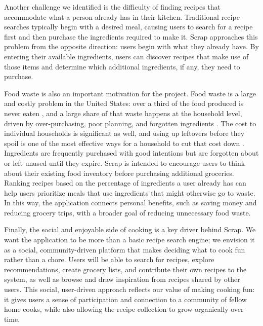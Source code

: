 Another challenge we identified is the difficulty of finding recipes that accommodate what a person already has in their kitchen. Traditional recipe searches typically begin with a desired meal, causing users to search for a recipe first and then purchase the ingredients required to make it. Scrap approaches this problem from the opposite direction: users begin with what they already have. By entering their available ingredients, users can discover recipes that make use of those items and determine which additional ingredients, if any, they need to purchase.

Food waste is also an important motivation for the project. Food waste is a large and costly problem in the United States: over a third of the food produced is never eaten \cite{EPAFoodWasteCost}, and a large share of that waste happens at the household level, driven by over-purchasing, poor planning, and forgotten ingredients \cite{ReFEDProblem}. The cost to individual households is significant as well, and using up leftovers before they spoil is one of the most effective ways for a household to cut that cost down \cite{USDATellusLeftovers}. Ingredients are frequently purchased with good intentions but are forgotten about or left unused until they expire. Scrap is intended to encourage users to think about their existing food inventory before purchasing additional groceries. Ranking recipes based on the percentage of ingredients a user already has can help users prioritize meals that use ingredients that might otherwise go to waste. In this way, the application connects personal benefits, such as saving money and reducing grocery trips, with a broader goal of reducing unnecessary food waste.

Finally, the social and enjoyable side of cooking is a key driver behind Scrap. We want the application to be more than a basic recipe search engine; we envision it as a social, community-driven platform that makes deciding what to cook fun rather than a chore. Users will be able to search for recipes, explore recommendations, create grocery lists, and contribute their own recipes to the system, as well as browse and draw inspiration from recipes shared by other users. This social, user-driven approach reflects our value of making cooking fun: it gives users a sense of participation and connection to a community of fellow home cooks, while also allowing the recipe collection to grow organically over time.

